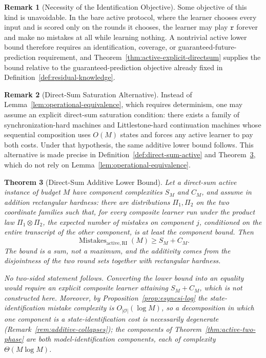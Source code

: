 \documentclass[12pt]{article}
\newtheorem{theorem}{Theorem}[section]
\theoremstyle{definition}
\newtheorem{remark}[theorem]{Remark}
\newcommand{\MistRI}{\operatorname{Mistakes}_{\mathrm{active,RI}}}
\begin{document}
\begin{remark}[Necessity of the Identification Objective]
\label{rem:active-objective-needed}
Some objective of this kind is unavoidable.  In the bare active protocol, where
the learner chooses every input and is scored only on the rounds it chooses, the
learner may play $\mathtt r$ forever and make no mistakes at all while learning
nothing.  A nontrivial active lower bound therefore requires an identification,
coverage, or guaranteed-future-prediction requirement, and
Theorem~\ref{thm:active-explicit-directsum} supplies the bound relative to the
guaranteed-prediction objective already fixed in
Definition~\ref{def:residual-knowledge}.
\end{remark}

\begin{remark}[Direct-Sum Saturation Alternative]
\label{rem:direct-sum-saturation}
Instead of Lemma~\ref{lem:operational-equivalence}, which requires
determinism, one may assume an
explicit direct-sum saturation condition: there exists a family of
synchronization-hard machines and Littlestone-hard continuation machines whose
sequential composition uses $O(M)$ states and forces any active learner to pay
both costs.  Under that hypothesis, the same additive lower bound follows.
This alternative is made precise in
Definition~\ref{def:direct-sum-active} and
Theorem~\ref{thm:active-direct-sum}, which do not rely on
Lemma~\ref{lem:operational-equivalence}.
\end{remark}

\begin{theorem}[Direct-Sum Additive Lower Bound]
\label{thm:active-direct-sum}
Let a direct-sum active instance of budget $M$ have component complexities
$S_M$ and $C_M$, and assume in addition \emph{rectangular hardness}: there are
distributions $\Pi_1,\Pi_2$ on the two coordinate families such that, for every
composite learner run under the product law $\Pi_1\otimes\Pi_2$, the expected
number of mistakes on component $j$, conditioned on the entire transcript of
the other component, is at least the component bound.  Then
\[
\MistRI(M)
\ge
S_M+C_M.
\]
The bound is a sum, not a maximum, and the additivity comes from the
disjointness of the two round sets together with rectangular hardness.

No two-sided statement follows.  Converting the lower bound into an equality
would require an explicit composite learner attaining $S_M+C_M$, which is not
constructed here.  Moreover, by Proposition~\ref{prop:esyncsi-log} the
state-identification mistake complexity is $O_{|\mathcal O|}(\log M)$, so a
decomposition in which one component is a state-identification cost is
necessarily degenerate (Remark~\ref{rem:additive-collapses}); the components of
Theorem~\ref{thm:active-two-phase} are both model-identification components,
each of complexity $\Theta(M\log M)$.
\end{theorem}
\end{document}
